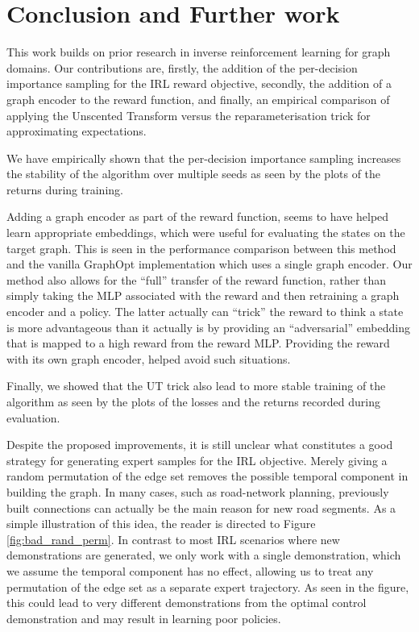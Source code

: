\documentclass{report}
\numberwithin{equation}{section}
\numberwithin{figure}{section}
\numberwithin{table}{section}
\numberwithin{algorithm}{section}
\begin{document}
\chapter{Conclusion and Further work}
This work builds on prior research in inverse reinforcement learning 
for graph domains. Our contributions are, firstly, the addition of the 
per-decision importance sampling for the IRL reward objective, 
secondly, the addition of a graph encoder to the reward function, 
and finally, an empirical comparison of applying the Unscented 
Transform \citep{JulierUT} versus the reparameterisation trick 
for approximating expectations.

We have empirically shown that the per-decision importance 
sampling increases
the stability of the algorithm over multiple seeds as seen by 
the plots of the returns during training.

Adding a graph encoder as part of the reward function, seems to 
have helped learn appropriate embeddings, which were useful for 
evaluating the states on the target graph. This is seen in the 
performance comparison between this method and 
the vanilla GraphOpt \citep{GraphOpt} 
implementation which uses a single graph encoder. Our method 
also allows for the ``full'' transfer of the reward function, 
rather than simply taking the MLP associated with the reward and 
then retraining a graph encoder and a policy. The latter actually 
can ``trick'' the reward to think a state is more advantageous than 
it actually is by providing an ``adversarial'' embedding that is 
mapped to a high reward from the reward MLP. Providing the reward 
with its own graph encoder, helped avoid such situations.

Finally, we showed that the UT trick also lead to more stable 
training of the algorithm as seen by the plots of the losses 
and the returns recorded during evaluation.

Despite the proposed improvements, it is still unclear what constitutes 
a good strategy for generating expert samples for the IRL objective. 
Merely giving a random permutation of the edge set removes the possible 
temporal component in building the graph. In many cases, such as 
road-network planning, previously built connections can actually 
be the main reason for new road segments. As a simple illustration 
of this idea, the reader is directed to Figure \ref{fig:bad_rand_perm}.
In contrast to most IRL scenarios where new demonstrations are generated, 
we only work with a single demonstration, which we assume the temporal 
component has no effect, allowing us to treat any permutation of the 
edge set as a separate expert trajectory. As seen in the figure, this 
could lead to very different demonstrations from the optimal control 
demonstration and may result in learning poor policies.
\end{document}
